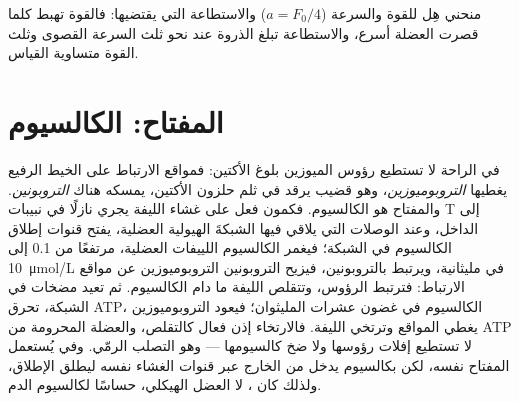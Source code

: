 \begin{omfigure}

{\small منحني هِل للقوة والسرعة ($a = F_0/4$) والاستطاعة التي
يقتضيها: فالقوة تهبط كلما قصرت العضلة أسرع، والاستطاعة تبلغ الذروة
عند نحو ثلث السرعة القصوى وثلث القوة متساوية
القياس.}
\end{omfigure}

\section{المفتاح: الكالسيوم}

\begin{proposition}\label{prop:b2:muscle-movement:coupling}
في الراحة لا تستطيع رؤوس الميوزين بلوغ الأكتين: فمواقع الارتباط
على الخيط الرفيع يغطيها \emph{التروبوميوزين}، وهو قضيب يرقد
في ثلم حلزون الأكتين، يمسكه هناك \emph{التروبونين}.
والمفتاح هو الكالسيوم. فكمون فعل على غشاء الليفة
يجري نازلًا في نبيبات T إلى الداخل، وعند الوصلات
التي يلاقي فيها  الشبكةَ الهيولية العضلية، يفتح
قنوات إطلاق الكالسيوم في الشبكة؛ فيغمر الكالسيوم اللييفات العضلية،
مرتفعًا من \qty{0.1}{} إلى \qty{10}{\micro mol/L} في مليثانية،
ويرتبط بالتروبونين، فيزيح التروبونين التروبوميوزين عن مواقع
الارتباط: فترتبط الرؤوس، وتتقلص الليفة ما دام
الكالسيوم. ثم تعيد مضخات في الشبكة، تحرق ATP،
الكالسيوم في غضون عشرات المليثوان؛ فيعود التروبوميوزين يغطي
المواقع وترتخي الليفة. فالارتخاء إذن فعال كالتقلص،
والعضلة المحرومة من ATP لا تستطيع إفلات
رؤوسها ولا ضخ كالسيومها --- وهو التصلب الرمّي. وفي  يُستعمل المفتاح
نفسه، لكن بكالسيوم يدخل من الخارج عبر
قنوات الغشاء نفسه ليطلق الإطلاق، ولذلك كان
، لا العضل الهيكلي، حساسًا لكالسيوم
الدم.
\end{proposition}

